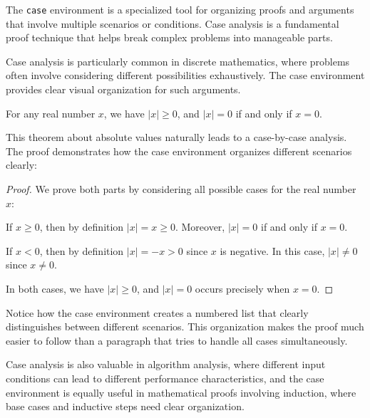 \documentclass[9pt]{amsart}
\begin{document}
The \texttt{case} environment is a specialized tool for organizing proofs and
arguments that involve multiple scenarios or conditions. Case analysis is a
fundamental proof technique that helps break complex problems into manageable
parts.

Case analysis is particularly common in discrete mathematics, where problems
often involve considering different possibilities exhaustively. The case
environment provides clear visual organization for such arguments.

\begin{theorem}
    For any real number $x$, we have $|x| \geq 0$, and $|x| = 0$ if and only if $x = 0$.
\end{theorem}

This theorem about absolute values naturally leads to a case-by-case analysis.
The proof demonstrates how the case environment organizes different scenarios
clearly:

\begin{proof}
    We prove both parts by considering all possible cases for the real number $x$:
    \begin{case}
        \item If $x \geq 0$, then by definition $|x| = x \geq 0$. Moreover, $|x| = 0$ if and
        only if $x = 0$.
        \item If $x < 0$, then by definition $|x| = -x > 0$ since $x$ is negative. In this
        case, $|x| \neq 0$ since $x \neq 0$.
    \end{case}
    In both cases, we have $|x| \geq 0$, and $|x| = 0$ occurs precisely when $x = 0$.
\end{proof}

Notice how the case environment creates a numbered list that clearly
distinguishes between different scenarios. This organization makes the proof
much easier to follow than a paragraph that tries to handle all cases
simultaneously.

Case analysis is also valuable in algorithm analysis, where different input
conditions can lead to different performance characteristics, and the case
environment is equally useful in mathematical proofs involving induction, where
base cases and inductive steps need clear organization.
\end{document}

